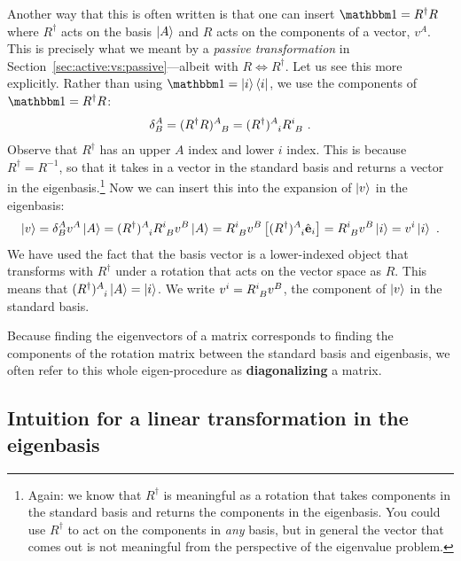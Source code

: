 \documentclass[12pt, oneside]{report}    %
\begin{document}
Another way that this is often written is that one can insert $\one = R^\dag R$ where $R^\dag$ acts on the basis $\left|A\right\rangle$ and $R$ acts on the components of a vector, $v^A$. This is precisely what we meant by a \emph{passive transformation} in Section~\ref{sec:active:vs:passive}---albeit with $R\Leftrightarrow R^\dag$. Let us see this more explicitly. Rather than using $\one = \ket{i}\bra{i}$, we use the components of $\one = R^\dag R$:
\begin{align}
    \delta^A_B = (R^\dag R)\aij{A}{B} = 
    (R^\dag)\aij{A}{i}R\aij{i}{B} \ .
\end{align}
Observe that $R^\dag$ has an upper $A$ index and lower $i$ index. This is because $R^\dag = R^{-1}$, so that it takes in a vector in the standard basis and returns a vector in the eigenbasis.\footnote{Again: we know that $R^\dag$ is meaningful as a rotation that takes components in the standard basis and returns the components in the eigenbasis. You could use $R^\dag$ to act on the components in \emph{any} basis, but in general the vector that comes out is not meaningful from the perspective of the eigenvalue problem.} Now we can insert this into the expansion of $\left|v\right\rangle$ in the eigenbasis:
\begin{align}
    \ket{v} = \delta^A_B v^A\ket{A} 
    = (R^\dag)\aij{A}{i} R\aij{i}{B} v^B \ket{A}
    = R\aij{i}B{v}^B \left[(R^\dag)\aij{A}{i}\bas{e}_i\right]
    = R\aij{i}B{v}^B \ket{i}
    = v^i \ket{i}  \ .
\end{align}
We have used the fact that the basis vector is a lower-indexed object that transforms with $R^\dag$ under a rotation that acts on the vector space as $R$. This means that $(R^\dag)\aij{A}{i}\ket{A} = \ket{i}$. We write $v^i = R\aij{i}{B} v^B$, the component of $\left|v\right\rangle$ in the standard basis. 


\begin{bigidea}
Because finding the eigenvectors of a matrix corresponds to finding the components of the rotation matrix between the standard basis and eigenbasis, we often refer to this whole eigen-procedure as \textbf{diagonalizing} a matrix.
\end{bigidea}



\subsection{Intuition for a linear transformation in the eigenbasis}
\end{document}
